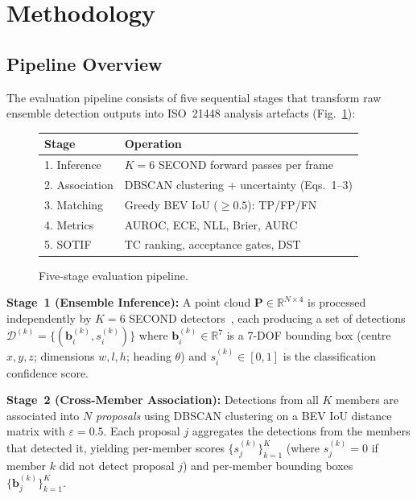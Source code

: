 \documentclass[conference]{IEEEtran}
\begin{document}

\section{Methodology}

\subsection{Pipeline Overview}

The evaluation pipeline consists of five sequential stages that transform raw ensemble detection outputs into ISO~21448 analysis artefacts (Fig.~\ref{fig:pipeline}):

\begin{figure}[t]
\centering
\small
\begin{tabular}{|l|l|}
\hline
\textbf{Stage} & \textbf{Operation} \\
\hline
1. Inference & $K{=}6$ SECOND forward passes per frame \\
2. Association & DBSCAN clustering + uncertainty (Eqs.~1--3) \\
3. Matching & Greedy BEV IoU ($\geq 0.5$): TP/FP/FN \\
4. Metrics & AUROC, ECE, NLL, Brier, AURC \\
5. SOTIF & TC ranking, acceptance gates, DST \\
\hline
\end{tabular}
\caption{Five-stage evaluation pipeline.}
\label{fig:pipeline}
\end{figure}

\textbf{Stage~1 (Ensemble Inference):} A point cloud $\mathbf{P} \in \mathbb{R}^{N \times 4}$ is processed independently by $K{=}6$ SECOND detectors~\cite{yan2018second}, each producing a set of detections $\mathcal{D}^{(k)} = \{(\mathbf{b}^{(k)}_i, s^{(k)}_i)\}$ where $\mathbf{b}^{(k)}_i \in \mathbb{R}^7$ is a 7-DOF bounding box (centre $x, y, z$; dimensions $w, l, h$; heading $\theta$) and $s^{(k)}_i \in [0, 1]$ is the classification confidence score.

\textbf{Stage~2 (Cross-Member Association):} Detections from all $K$ members are associated into $N$ \emph{proposals} using DBSCAN clustering on a BEV IoU distance matrix with $\varepsilon{=}0.5$. Each proposal $j$ aggregates the detections from the members that detected it, yielding per-member scores $\{s^{(k)}_j\}_{k=1}^{K}$ (where $s^{(k)}_j = 0$ if member $k$ did not detect proposal $j$) and per-member bounding boxes $\{\mathbf{b}^{(k)}_j\}_{k=1}^{K}$.
\end{document}
